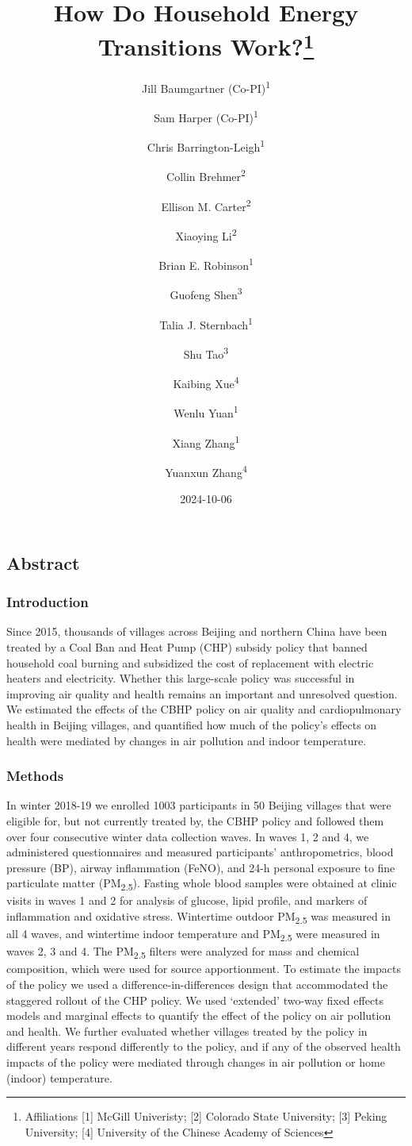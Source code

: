 \documentclass[
  letterpaper,
  DIV=11,
  numbers=noendperiod]{scrartcl}
\title{How Do Household Energy Transitions Work?\thanks{Affiliations
{[}1{]} McGill Univeristy; {[}2{]} Colorado State University; {[}3{]}
Peking University; {[}4{]} University of the Chinese Academy of
Sciences}}
\author{Jill Baumgartner (Co-PI)\textsuperscript{1} \and Sam Harper
(Co-PI)\textsuperscript{1} \and Chris
Barrington-Leigh\textsuperscript{1} \and Collin
Brehmer\textsuperscript{2} \and Ellison M.
Carter\textsuperscript{2} \and Xiaoying Li\textsuperscript{2} \and Brian
E. Robinson\textsuperscript{1} \and Guofeng
Shen\textsuperscript{3} \and Talia J.
Sternbach\textsuperscript{1} \and Shu
Tao\textsuperscript{3} \and Kaibing Xue\textsuperscript{4} \and Wenlu
Yuan\textsuperscript{1} \and Xiang Zhang\textsuperscript{1} \and Yuanxun
Zhang\textsuperscript{4}}
\date{2024-10-06}
\renewcommand*\contentsname{Table of contents}
\newcommand\contentsname{Table of contents}
\begin{document}
\maketitle

\renewcommand*\contentsname{Table of contents}
{
\hypersetup{linkcolor=}
\setcounter{tocdepth}{3}
\tableofcontents
}

\subsection*{Abstract}\label{abstract}

\subsubsection*{Introduction}\label{introduction}

Since 2015, thousands of villages across Beijing and northern China have
been treated by a Coal Ban and Heat Pump (CHP) subsidy policy that
banned household coal burning and subsidized the cost of replacement
with electric heaters and electricity. Whether this large-scale policy
was successful in improving air quality and health remains an important
and unresolved question. We estimated the effects of the CBHP policy on
air quality and cardiopulmonary health in Beijing villages, and
quantified how much of the policy's effects on health were mediated by
changes in air pollution and indoor temperature.

\subsubsection*{Methods}\label{methods}

In winter 2018-19 we enrolled 1003 participants in 50 Beijing villages
that were eligible for, but not currently treated by, the CBHP policy
and followed them over four consecutive winter data collection waves. In
waves 1, 2 and 4, we administered questionnaires and measured
participants' anthropometrics, blood pressure (BP), airway inflammation
(FeNO), and 24-h personal exposure to fine particulate matter
(PM\textsubscript{2.5}). Fasting whole blood samples were obtained at
clinic visits in waves 1 and 2 for analysis of glucose, lipid profile,
and markers of inflammation and oxidative stress. Wintertime outdoor
PM\textsubscript{2.5} was measured in all 4 waves, and wintertime indoor
temperature and PM\textsubscript{2.5} were measured in waves 2, 3 and 4.
The PM\textsubscript{2.5} filters were analyzed for mass and chemical
composition, which were used for source apportionment. To estimate the
impacts of the policy we used a difference-in-differences design that
accommodated the staggered rollout of the CHP policy. We used `extended'
two-way fixed effects models and marginal effects to quantify the effect
of the policy on air pollution and health. We further evaluated whether
villages treated by the policy in different years respond differently to
the policy, and if any of the observed health impacts of the policy were
mediated through changes in air pollution or home (indoor) temperature.
\end{document}
